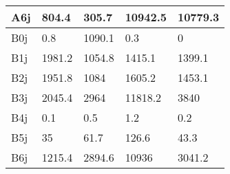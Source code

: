 \begin{table}[!ht]
\begin{tabular}{|l|l|l|l|l|}
        A6j & 804.4 & 305.7 & 10942.5 & 10779.3 \\ \hline
        B0j & 0.8 & 1090.1 & 0.3 & 0 \\ \hline
        B1j & 1981.2 & 1054.8 & 1415.1 & 1399.1 \\ \hline
        B2j & 1951.8 & 1084 & 1605.2 & 1453.1 \\ \hline
        B3j & 2045.4 & 2964 & 11818.2 & 3840 \\ \hline
        B4j & 0.1 & 0.5 & 1.2 & 0.2 \\ \hline
        B5j & 35 & 61.7 & 126.6 & 43.3 \\ \hline
        B6j & 1215.4 & 2894.6 & 10936 & 3041.2 \\ \hline
    \end{tabular}
\end{table}